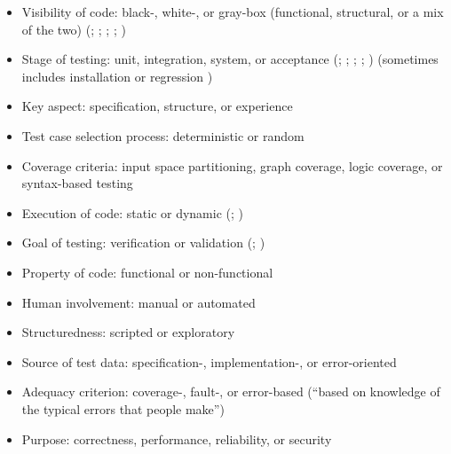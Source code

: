\begin{itemize}
      \item Visibility of code: black-, white-, or gray-box (functional,
            structural, or a mix of the two)
            (\citealp[pp.~5-10, 5-16]{SWEBOK2024};
            \citealp[pp.~57-58]{AmmannAndOffutt2017};
            \citealp[p.~213]{KuļešovsEtAl2013};
            \citealp[pp.~53, 218]{Patton2006}; \citealp[p.~69]{Perry2006})
      \item Stage of testing: unit, integration, system, or acceptance
            (\citealp[pp.~5-6 to 5-7]{SWEBOK2024}; \citealp[p.~218]{KuļešovsEtAl2013};
            \citealp{Patton2006}; \citealp{Perry2006}; \citealp{PetersAndPedrycz2000})
            (sometimes includes installation \citep[p.~439]{vanVliet2000} or
            regression \citep[p.~3]{BarbosaEtAl2006})
      \item Key aspect: specification, structure, or experience
            \citep[p.~5-10]{SWEBOK2024}
      \item Test case selection process: deterministic or random
            \citep[p.~5-16]{SWEBOK2024}
      \item Coverage criteria: input space partitioning, graph coverage, logic
            coverage, or syntax-based testing \citep[pp.~18-19]{AmmannAndOffutt2017}
      \item Execution of code: static or dynamic
            (\citealp[p.~214]{KuļešovsEtAl2013}; \citealp[p.~53]{Patton2006})
      \item Goal of testing: verification or validation
            (\citealp[p.~214]{KuļešovsEtAl2013}; \citealp[pp.~69-70]{Perry2006})
      \item Property of code: functional or non-functional
            \citep[p.~213]{KuļešovsEtAl2013}
      \item Human involvement: manual or automated
            \citep[p.~214]{KuļešovsEtAl2013}
      \item Structuredness: scripted or exploratory
            \citep[p.~214]{KuļešovsEtAl2013}
      \item Source of test data: specification-, implementation-, or
            error-oriented \citep[p.~440]{PetersAndPedrycz2000}
      \item Adequacy criterion: coverage-, fault-, or error-based
            (``based on knowledge of the typical errors that people make'')
            \citep[pp.~398-399]{vanVliet2000}
      \item Purpose: correctness, performance, reliability, or security
            \citep{Pan1999}
\end{itemize}

